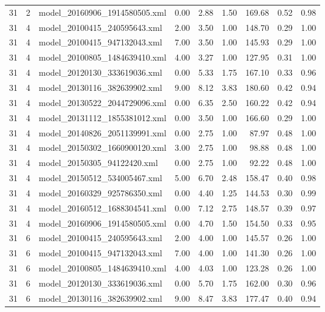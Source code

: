 \begin{table}[ht]
\begin{tabular}{rrlrrrrrr}
   31 &   2 & model\_20160906\_1914580505.xml & 0.00 & 2.88 & 1.50 & 169.68 & 0.52 & 0.98 \\ 
   31 &   4 & model\_20100415\_240595643.xml & 2.00 & 3.50 & 1.00 & 148.70 & 0.29 & 1.00 \\ 
   31 &   4 & model\_20100415\_947132043.xml & 7.00 & 3.50 & 1.00 & 145.93 & 0.29 & 1.00 \\ 
   31 &   4 & model\_20100805\_1484639410.xml & 4.00 & 3.27 & 1.00 & 127.95 & 0.31 & 1.00 \\ 
   31 &   4 & model\_20120130\_333619036.xml & 0.00 & 5.33 & 1.75 & 167.10 & 0.33 & 0.96 \\ 
   31 &   4 & model\_20130116\_382639902.xml & 9.00 & 8.12 & 3.83 & 180.60 & 0.42 & 0.94 \\ 
   31 &   4 & model\_20130522\_2044729096.xml & 0.00 & 6.35 & 2.50 & 160.22 & 0.42 & 0.94 \\ 
   31 &   4 & model\_20131112\_1855381012.xml & 0.00 & 3.50 & 1.00 & 166.60 & 0.29 & 1.00 \\ 
   31 &   4 & model\_20140826\_2051139991.xml & 0.00 & 2.75 & 1.00 & 87.97 & 0.48 & 1.00 \\ 
   31 &   4 & model\_20150302\_1660900120.xml & 3.00 & 2.75 & 1.00 & 98.88 & 0.48 & 1.00 \\ 
   31 &   4 & model\_20150305\_94122420.xml & 0.00 & 2.75 & 1.00 & 92.22 & 0.48 & 1.00 \\ 
   31 &   4 & model\_20150512\_534005467.xml & 5.00 & 6.70 & 2.48 & 158.47 & 0.40 & 0.98 \\ 
   31 &   4 & model\_20160329\_925786350.xml & 0.00 & 4.40 & 1.25 & 144.53 & 0.30 & 0.99 \\ 
   31 &   4 & model\_20160512\_1688304541.xml & 0.00 & 7.12 & 2.75 & 148.57 & 0.39 & 0.97 \\ 
   31 &   4 & model\_20160906\_1914580505.xml & 0.00 & 4.70 & 1.50 & 154.50 & 0.33 & 0.95 \\ 
   31 &   6 & model\_20100415\_240595643.xml & 2.00 & 4.00 & 1.00 & 145.57 & 0.26 & 1.00 \\ 
   31 &   6 & model\_20100415\_947132043.xml & 7.00 & 4.00 & 1.00 & 141.30 & 0.26 & 1.00 \\ 
   31 &   6 & model\_20100805\_1484639410.xml & 4.00 & 4.03 & 1.00 & 123.28 & 0.26 & 1.00 \\ 
   31 &   6 & model\_20120130\_333619036.xml & 0.00 & 5.70 & 1.75 & 162.00 & 0.30 & 0.96 \\ 
   31 &   6 & model\_20130116\_382639902.xml & 9.00 & 8.47 & 3.83 & 177.47 & 0.40 & 0.94 \\ 

\end{tabular}
\end{table}
